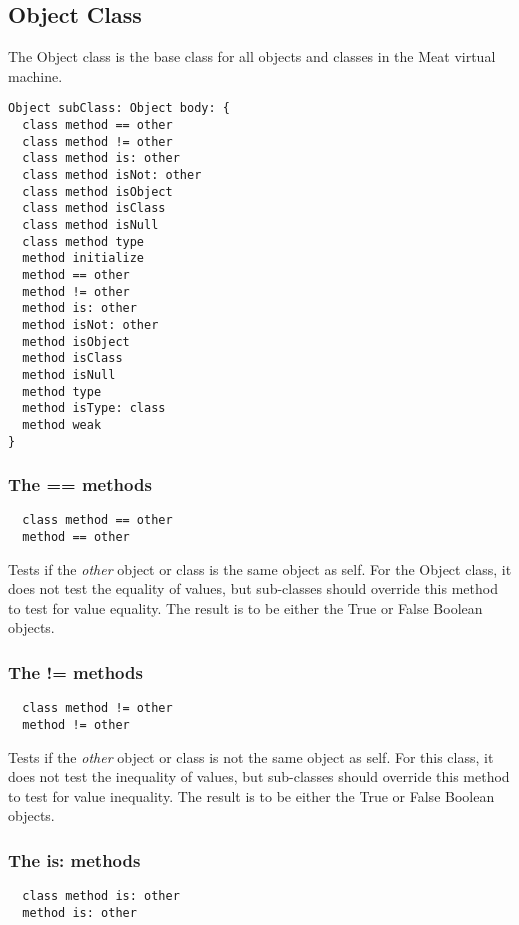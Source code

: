\subsection {Object Class}

The Object class is the base class for all objects and classes in the
Meat virtual machine.

\begin{lstlisting}
Object subClass: Object body: {
  class method == other
  class method != other
  class method is: other
  class method isNot: other
  class method isObject
  class method isClass
  class method isNull
  class method type
  method initialize
  method == other
  method != other
  method is: other
  method isNot: other
  method isObject
  method isClass
  method isNull
  method type
  method isType: class
  method weak
}
\end{lstlisting}

\subsubsection {The == methods}
\begin{lstlisting}
  class method == other
  method == other
\end{lstlisting}

Tests if the \textit{other} object or class is the same object as self. For
the Object class, it does not test the equality of values, but sub-classes
should override this method to test for value equality. The result is to be
either the True or False Boolean objects.

\hfill
\subsubsection {The != methods}
\begin{lstlisting}
  class method != other
  method != other
\end{lstlisting}

Tests if the \textit{other} object or class is not the same object as self.
For this class, it does not test the inequality of values, but sub-classes
should override this method to test for value inequality. The result is to be
either the True or False Boolean objects.

\hfill
\subsubsection {The is: methods}
\begin{lstlisting}
  class method is: other
  method is: other
\end{lstlisting}

